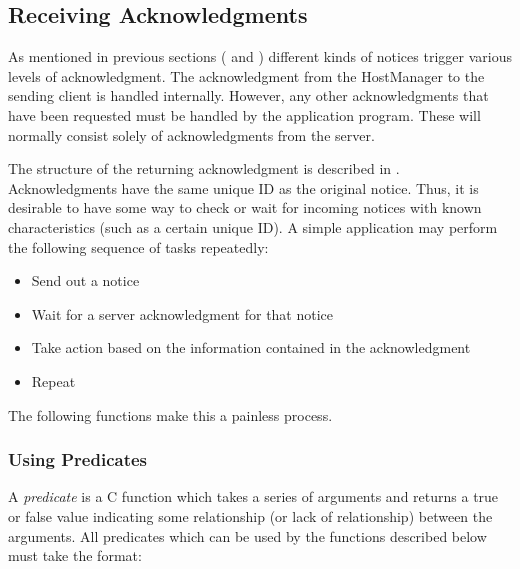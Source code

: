 %
\subsection{Receiving Acknowledgments}
\label{receiving-acknowledgments}

As mentioned in previous sections ( and
) different kinds of notices trigger various
levels of acknowledgment.  The acknowledgment from the HostManager to
the sending client is handled internally.  However, any other
acknowledgments that have been requested must be handled by the
application program.  These will normally consist solely of
acknowledgments from the server.

The structure of the returning acknowledgment is described in
.  Acknowledgments have the same
unique ID as the original notice.  Thus, it is desirable to have some
way to check or wait for incoming notices with known characteristics
(such as a certain unique ID).  A simple application may perform the
following sequence of tasks repeatedly:

\begin{itemize}
\item Send out a notice
\item Wait for a server acknowledgment for that notice
\item Take action based on the information contained in the
acknowledgment
\item Repeat
\end{itemize}
The following functions make this a painless process.

\subsubsection{Using Predicates}
\label{using-predicates}

A {\em predicate\/} is a C function which takes a series of arguments
and returns a true or false value indicating some relationship (or
lack of relationship) between the arguments.  All predicates which can
be used by the functions described below must take the format:

\nwetemplate

